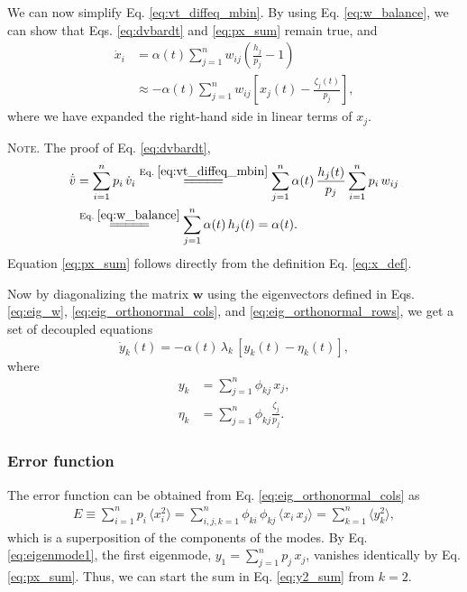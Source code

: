 \documentclass[reprint, floatfix]{revtex4-1}
\newcommand{\note}[1]{{\color{DarkGreen}\footnotesize \textsc{Note.} #1}}
\newcommand{\Err}{E}
\begin{document}
We can now simplify Eq. \eqref{eq:vt_diffeq_mbin}.
%
By using Eq. \eqref{eq:w_balance},
we can show that
Eqs. \eqref{eq:dvbardt} and \eqref{eq:px_sum}
remain true, and
%
$$
\begin{aligned}
\dot x_i
&= \alpha(t) \sum_{j=1}^n w_{ij}
\left( \frac{ h_j } { p_j }  - 1 \right)
\\
&\approx
-\alpha(t) \sum_{j = 1}^n
w_{ij} \left[ x_j(t) - \frac{\zeta_j (t)}{p_j} \right],
\end{aligned}
$$
where
we have expanded the right-hand side
in linear terms of $x_j$.

\note{The proof of Eq. \eqref{eq:dvbardt},
$$
\begin{aligned}
  \dot{ \bar v }
  &=
  \sum_{i = 1}^n p_i \, \dot v_i
  \stackrel{\mathrm{Eq.\; \eqref{eq:vt_diffeq_mbin}}}
  {=\joinrel=\joinrel=\joinrel=\joinrel=}
  \sum_{j = 1}^n \alpha(t) \, \frac{ h_j(t) } { p_j }
                 \sum_{ i = 1 }^{n} p_i \, w_{ij}
  \\
  &
  \stackrel{\mathrm{Eq.\; \eqref{eq:w_balance}}}
  {=\joinrel=\joinrel=\joinrel=\joinrel=}
  \sum_{j = 1}^n \alpha(t) \, h_j(t)
  =
  \alpha(t).
\end{aligned}
$$
Equation \eqref{eq:px_sum} follows directly from the definition
Eq. \eqref{eq:x_def}.
}

Now by diagonalizing the matrix $\mathbf w$
using the eigenvectors defined in Eqs. \eqref{eq:eig_w},
\eqref{eq:eig_orthonormal_cols},
and
\eqref{eq:eig_orthonormal_rows},
we get a set of decoupled equations
%
\begin{equation}
\dot y_k(t)
=
-\alpha(t) \, \lambda_k \, [y_k(t) - \eta_k(t)],
\label{eq:yt_diffeq}
\end{equation}
%
where
\begin{align}
  y_k &= \sum_{j=1}^n \phi_{kj} \, x_j,
  \label{eq:y_def}
  \\
  \eta_k &= \sum_{j=1}^n \phi_{kj} \frac{ \zeta_j}{ p_j}.
  \label{eq:eta_def}
\end{align}



\subsubsection{Error function}



The error function can be obtained
from Eq. \eqref{eq:eig_orthonormal_cols}
as
\begin{align}
  \Err
  \equiv
  \sum_{i = 1}^n p_i \,
                 \langle x_i^2 \rangle
  =
  \sum_{i, j, k=1}^n \phi_{ki} \, \phi_{kj} \,
                     \langle x_i \, x_j \rangle
  =
  \sum_{k = 1}^n \langle y_k^2 \rangle,
  \label{eq:y2_sum}
\end{align}
%
which is a superposition of the components of the modes.
%
By Eq. \eqref{eq:eigenmode1},
the first eigenmode, $y_1 = \sum_{j=1}^n p_j \, x_j$,
vanishes identically by Eq. \eqref{eq:px_sum}.
%
Thus, we can start the sum in Eq. \eqref{eq:y2_sum}
from $k = 2$.
\end{document}
